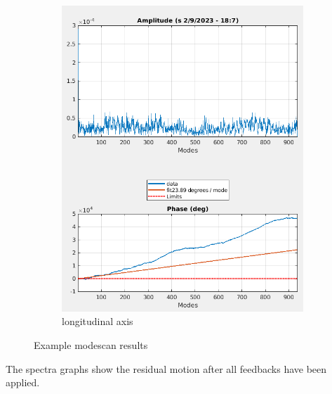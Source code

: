 \documentclass{report}
\begin{document}
\begin{figure}[hbt]
    \begin{subfigure}[b]{0.45\textwidth}
        \includegraphics[width=\textwidth]{vlr_modescan_s.png}
        \caption{longitudinal axis}
        \label{fig:modescan_example_z}
    \end{subfigure}
    \caption{Example modescan results}
    \label{fig:modescan_example}
\end{figure}

 The spectra graphs show the residual motion after all feedbacks have been applied.
\end{document}
